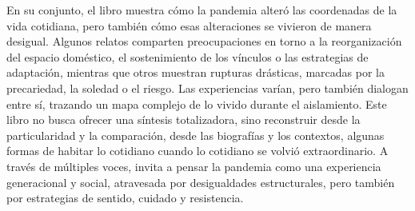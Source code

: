 \begin{refsection}
En su conjunto, el libro muestra cómo la pandemia alteró las coordenadas de la vida cotidiana, pero también cómo esas alteraciones se vivieron de manera desigual. Algunos relatos comparten preocupaciones en torno a la reorganización del espacio doméstico, el sostenimiento de los vínculos o las estrategias de adaptación, mientras que otros muestran rupturas drásticas, marcadas por la precariedad, la soledad o el riesgo. Las experiencias varían, pero también dialogan entre sí, trazando un mapa complejo de lo vivido durante el aislamiento. Este libro no busca ofrecer una síntesis totalizadora, sino reconstruir desde la particularidad y la comparación, desde las biografías y los contextos, algunas formas de habitar lo cotidiano cuando lo cotidiano se volvió extraordinario. A través de múltiples voces, invita a pensar la pandemia como una experiencia generacional y social, atravesada por desigualdades estructurales, pero también por estrategias de sentido, cuidado y resistencia.


\section*{\refname}
\printbibliography[heading=none]
\end{refsection}

